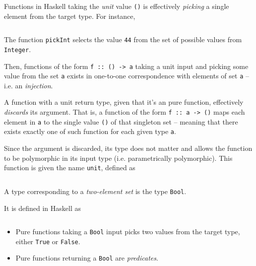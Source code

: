 \begin{remark}
    Functions in Haskell taking the \textit{unit} value \texttt{()} is effectively \textit{picking} a single element from the target type. For instance,
    \inputminted{hs}{content/code-listings/unit-example.hs}
    The function \texttt{pickInt} selects the value \texttt{44} from the set of possible values from \texttt{Integer}.
    
    Then, functions of the form \texttt{f :: () -> a} taking a unit input and picking some value from the set \texttt{a} exists in one-to-one correspondence with elements of set \texttt{a} -- i.e. an \textit{injection}.
    
    A function with a unit return type, given that it's an pure function, effectively \textit{discards} its argument. That is, a function of the form \texttt{f :: a -> ()} maps each element in \texttt{a} to the single value \texttt{()} of that singleton set -- meaning that there exists exactly one of such function for each given type \texttt{a}.
    
    Since the argument is discarded, its type does not matter and allows the function to be polymorphic in its input type (i.e. parametrically polymorphic). This function is given the name \texttt{unit}, defined as
    \inputminted{hs}{content/code-listings/unit.hs}
\end{remark}

\begin{definition}
    A type corresponding to a \textit{two-element set} is the type \texttt{Bool}.
    
    It is defined in Haskell as
    \inputminted{hs}{content/code-listings/bool.hs}
    
    \begin{itemize}
        \item Pure functions taking a \texttt{Bool} input picks two values from the target type, either \texttt{True} or \texttt{False}.
        \item Pure functions returning a \texttt{Bool} are \textit{predicates}.
    \end{itemize}
\end{definition}

